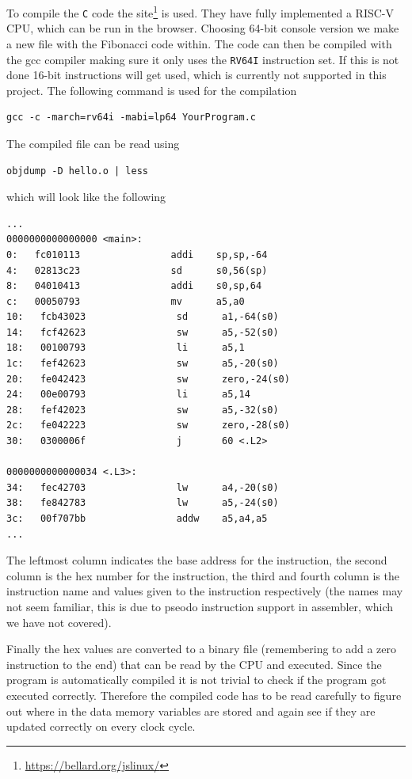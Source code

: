         To compile the \texttt{C} code the site\footnote{\url{https://bellard.org/jslinux/} } is used. They have fully implemented a RISC-V CPU, which can be run in the browser. Choosing 64-bit console version we make a new file with the Fibonacci code within. The code can then be compiled with the gcc compiler making sure it only uses the \texttt{RV64I} instruction set. If this is not done 16-bit instructions will get used, which is currently not supported in this project. The following command is used for the compilation
        \begin{lstlisting}[language={[Sharp]C}]
gcc -c -march=rv64i -mabi=lp64 YourProgram.c
        \end{lstlisting}
        The compiled file can be read using
        \begin{lstlisting}[language={[Sharp]C}]
objdump -D hello.o | less
        \end{lstlisting} 
        which will look like the following
        \begin{lstlisting}[language={[Sharp]C}]
...
0000000000000000 <main>:
0:   fc010113                addi    sp,sp,-64
4:   02813c23                sd      s0,56(sp)
8:   04010413                addi    s0,sp,64
c:   00050793                mv      a5,a0
10:   fcb43023                sd      a1,-64(s0)
14:   fcf42623                sw      a5,-52(s0)
18:   00100793                li      a5,1
1c:   fef42623                sw      a5,-20(s0)
20:   fe042423                sw      zero,-24(s0)
24:   00e00793                li      a5,14
28:   fef42023                sw      a5,-32(s0)
2c:   fe042223                sw      zero,-28(s0)
30:   0300006f                j       60 <.L2>

0000000000000034 <.L3>:
34:   fec42703                lw      a4,-20(s0)
38:   fe842783                lw      a5,-24(s0)
3c:   00f707bb                addw    a5,a4,a5
...
        \end{lstlisting} 
        The leftmost column indicates the base address for the instruction, the second column is the hex number for the instruction, the third and fourth column is the instruction name and values given to the instruction respectively (the names may not seem familiar, this is due to pseodo instruction support in assembler, which we have not covered).
        
        Finally the hex values are converted to a binary file (remembering to add a zero instruction to the end) that can be read by the CPU and executed. Since the program is automatically compiled it is not trivial to check if the program got executed correctly. Therefore the compiled code has to be read carefully to figure out where in the data memory variables are stored and again see if they are updated correctly on every clock cycle. 
        
